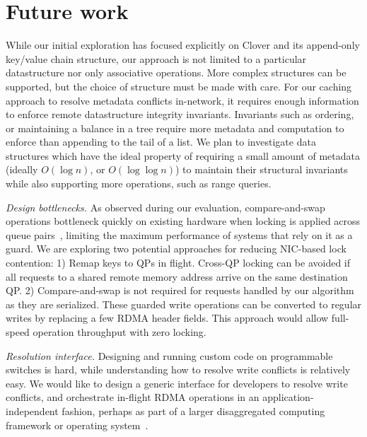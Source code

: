 \section{Future work}
\label{sec:future}

While our initial exploration has focused explicitly on Clover and its
append-only key/value chain structure, our approach is not limited to
a particular datastructure nor only associative operations. More
complex structures can be supported, but the choice of structure must
be made with care.  For our caching approach to resolve metadata
conflicts in-network, it requires enough information to enforce remote
datastructure integrity invariants. Invariants such as ordering, or
maintaining a balance in a tree require more metadata and computation
to enforce than appending to the tail of a list. We plan to
investigate data structures which have the ideal property of requiring
a small amount of metadata (ideally $O(\log n)$, or $O(\log\log n)$) to
maintain their structural invariants while also supporting more
operations, such as range queries.

\emph{Design bottlenecks.} As observed during our evaluation,
compare-and-swap operations bottleneck quickly on existing hardware
when locking is applied across queue pairs~\cite{design-guidelines},
limiting the maximum performance of systems that rely on it as a
guard.  We are exploring two potential approaches for reducing
NIC-based lock contention: 1) Remap keys to QPs in flight. Cross-QP
locking can be avoided if all requests to a shared remote memory
address arrive on the same destination QP. 2) Compare-and-swap is not
required for requests handled by our algorithm as they are serialized.
These guarded write operations can be converted to regular writes by
replacing a few RDMA header fields. This approach would allow
full-speed operation throughput with zero locking.


\emph{Resolution interface.}
Designing and running custom code on programmable switches is hard,
while understanding how to resolve write conflicts is relatively
easy. We would like to design a generic interface for developers to
resolve write conflicts, and orchestrate in-flight RDMA operations in
an application-independent fashion, perhaps as part of a larger
disaggregated computing framework or operating system~\cite{legoos}.
